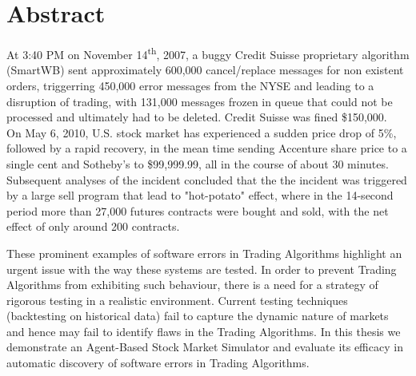 \chapter*{Abstract}
At 3:40 PM on November 14\textsuperscript{th}, 2007, a buggy Credit Suisse proprietary algorithm (SmartWB) sent approximately 600,000 cancel/replace messages for non existent orders, triggerring 450,000 error messages from the NYSE and leading to a disruption of trading, with 131,000 messages frozen in queue that could not be processed and ultimately had to be deleted. Credit Suisse was fined \$150,000.~\cite{Nyse2009} On May 6, 2010, U.S. stock market has experienced a sudden price drop of 5\%, followed by a rapid recovery, in the mean time sending Accenture share price to a single cent and Sotheby’s to \$99,999.99, all in the course of about 30 minutes. Subsequent analyses of the incident concluded that the the incident was triggered by a large sell program that lead to "hot-potato" effect, where in the 14-second period more than 27,000 futures contracts were bought and sold, with the net effect of only around 200 contracts.~\cite{Kirilenko2011}

These prominent examples of software errors in Trading Algorithms highlight an urgent issue with the way these systems are tested. In order to prevent Trading Algorithms from exhibiting such behaviour, there is a need for a strategy of rigorous testing in a realistic environment. Current testing techniques (backtesting on historical data) fail to capture the dynamic nature of markets and hence may fail to identify flaws in the Trading Algorithms. In this thesis we demonstrate an Agent-Based Stock Market Simulator and evaluate its efficacy in automatic discovery of software errors in Trading Algorithms.
\vfill